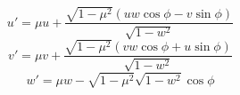 \begin{equation}
u' = \mu u + \frac{\sqrt{1 - \mu^2} ( uw \cos\phi - v \sin\phi )}{\sqrt{1 -
w^2}} 
\end{equation}
\begin{equation}
v' = \mu v + \frac{\sqrt{1 - \mu^2} ( vw \cos\phi + u \sin\phi )}{\sqrt{1 -
w^2}} 
\end{equation}
\begin{equation}
w' = \mu w - \sqrt{1 - \mu^2} \sqrt{1 - w^2} \cos\phi
\end{equation}

%
